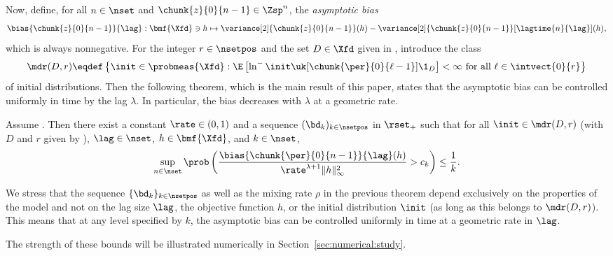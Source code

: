 Now, define, for all $n \in \nset$ and $\chunk{z}{0}{n - 1} \in \Zsp^n$, the \emph{asymptotic bias}  
\begin{equation} \label{eq:def:bias}
\bias{\chunk{z}{0}{n - 1}}{\lag} : \bmf{\Xfd} \ni h \mapsto \variance[2]{\chunk{z}{0}{n - 1}}(h) - \variance[2]{\chunk{z}{0}{n - 1}}[\lagtime{n}{\lag}](h), 
\end{equation}
which is always nonnegative. For the integer $r \in \nsetpos$ and the set $D \in \Xfd$ given in , introduce the class 
\begin{equation} \label{eq:class:initial:distributions}
\mdr(D, r) \eqdef \left\{ \init \in \probmeas{\Xfd} : \E \left[ \ln^- \init \uk[\chunk{\per}{0}{\ell - 1}] \1_D \right] < \infty \mbox{ for all $\ell \in \intvect{0}{r}$} \right \}
\end{equation}
of initial distributions. Then the following theorem, which is the main result of this paper, states that the asymptotic bias can be controlled uniformly in time by the lag $\lambda$. In particular, the bias decreases with $\lambda$ at a geometric rate. 

\begin{theorem} \label{thm:tightness:bias}
Assume . Then there exist a constant $\rate \in (0, 1)$ and a sequence $(\bd_k)_{k \in \nsetpos}$ in $\rset_+$ such that for all $\init \in \mdr(D, r)$ (with $D$ and $r$ given by ), $\lag \in \nset$, $h \in \bmf{\Xfd}$, and $k \in \nset$,
\begin{equation} \label{eq:bias:bound}
\sup_{n \in \nset} \prob \left( \frac{\bias{\chunk{\per}{0}{n - 1}}{\lag}(h)}{\rate^{\lambda + 1} \| h \|_{\infty}^2} > c_k  \right) \leq \frac{1}{k}.   
\end{equation}
\end{theorem}

\begin{remark}
We stress that the sequence $\{ \bd_k \}_{k \in \nsetpos}$ as well as the mixing rate $\rho$ in the previous theorem depend exclusively on the properties of the model and not on the lag size $\lag$, the objective function $h$, or the initial distribution $\init$ (as long as this belongs to $\mdr(D, r)$). This means that at any level specified by $k$, the asymptotic bias can be controlled uniformly in time at a geometric rate in $\lag$.
\end{remark} 

The strength of these bounds will be illustrated numerically in Section~\ref{sec:numerical:study}. 

